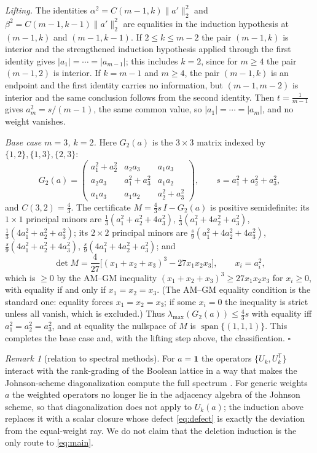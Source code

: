 \documentclass[11pt]{article}
\theoremstyle{remark}
\newtheorem{remark}[theorem]{Remark}
\begin{document}
\emph{Lifting.} The identities $\alpha^2=C(m-1,k)\|a'\|_2^2$ and
$\beta^2=C(m-1,k-1)\|a'\|_2^2$ are equalities in the induction hypothesis at
$(m-1,k)$ and $(m-1,k-1)$. If $2\le k\le m-2$ the pair $(m-1,k)$ is
interior and the strengthened induction hypothesis applied through the
first identity gives $|a_1|=\cdots=|a_{m-1}|$; this includes $k=2$, since
for $m\ge4$ the pair $(m-1,2)$ is interior. If $k=m-1$ and $m\ge4$, the
pair $(m-1,k)$ is an endpoint and the first identity carries no
information, but $(m-1,m-2)$ is interior and the same conclusion follows
from the second identity. Then $t=\frac1{m-1}$ gives $a_m^2=s/(m-1)$,
the same common value, so $|a_1|=\cdots=|a_m|$, and no weight vanishes.

\emph{Base case $m=3$, $k=2$.} Here $G_2(a)$ is the $3\times3$ matrix
indexed by $\{1,2\},\{1,3\},\{2,3\}$:
\[
G_2(a)=\begin{pmatrix} a_1^2+a_2^2 & a_2a_3 & a_1a_3\\
a_2a_3 & a_1^2+a_3^2 & a_1a_2\\
a_1a_3 & a_1a_2 & a_2^2+a_3^2 \end{pmatrix},
\qquad s=a_1^2+a_2^2+a_3^2,
\]
and $C(3,2)=\frac43$. The certificate $M=\frac43 s\,I-G_2(a)$ is
positive semidefinite: its $1\times1$ principal minors are
$\frac13(a_1^2+a_2^2+4a_3^2)$, $\frac13(a_1^2+4a_2^2+a_3^2)$,
$\frac13(4a_1^2+a_2^2+a_3^2)$; its $2\times2$ principal minors are
$\frac{s}{9}(a_1^2+4a_2^2+4a_3^2)$, $\frac{s}{9}(4a_1^2+a_2^2+4a_3^2)$,
$\frac{s}{9}(4a_1^2+4a_2^2+a_3^2)$; and
\[
\det M=\frac{4}{27}\bigl[(x_1+x_2+x_3)^3-27x_1x_2x_3\bigr],
\qquad x_i=a_i^2,
\]
which is $\ge0$ by the AM--GM inequality
$(x_1+x_2+x_3)^3\ge27x_1x_2x_3$ for $x_i\ge0$, with equality if and only
if $x_1=x_2=x_3$. (The AM--GM equality condition is the standard one:
equality forces $x_1=x_2=x_3$; if some $x_i=0$ the inequality is strict
unless all vanish, which is excluded.) Thus $\lambda_{\max}(G_2(a))\le
\frac43 s$ with equality iff $a_1^2=a_2^2=a_3^2$, and at equality the
nullspace of $M$ is $\operatorname{span}\{(1,1,1)\}$. This completes the
base case and, with the lifting step above, the classification.
\hfill$\square$

\begin{remark}[relation to spectral methods]\label{rem:spectral}
For $a=\mathbf 1$ the operators $\{U_k,U_k^{\mathsf T}\}$ interact with
the rank-grading of the Boolean lattice in a way that makes the
Johnson-scheme diagonalization compute the full spectrum
\cite{srinivasan2011,bannai1984}. For generic weights $a$ the weighted
operators no longer lie in the adjacency algebra of the Johnson scheme,
so that diagonalization does not apply to $U_k(a)$; the induction above
replaces it with a scalar closure whose defect \eqref{eq:defect} is
exactly the deviation from the equal-weight ray. We do not claim that the
deletion induction is the only route to \eqref{eq:main}.
\end{remark}
\end{document}
